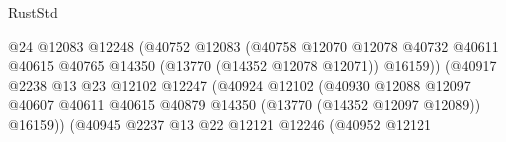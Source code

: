 \begin{lexlean}{RustStd}
\begin{coremodule}
                                                    @24
                                                    @12083
                                                    @12248
                                                    (@40752
                                                      @12083
                                                      (@40758
                                                        @12070
                                                        @12078
                                                        @40732
                                                        @40611
                                                        @40615
                                                        @40765
                                                        @14350
                                                        (@13770 (@14352 @12078 @12071))
                                                        @16159))
                                                    (@40917
                                                      @2238
                                                      @13
                                                      @23
                                                      @12102
                                                      @12247
                                                      (@40924
                                                        @12102
                                                        (@40930
                                                          @12088
                                                          @12097
                                                          @40607
                                                          @40611
                                                          @40615
                                                          @40879
                                                          @14350
                                                          (@13770 (@14352 @12097 @12089))
                                                          @16159))
                                                      (@40945
                                                        @2237
                                                        @13
                                                        @22
                                                        @12121
                                                        @12246
                                                        (@40952
                                                          @12121

\end{coremodule}
\end{lexlean}
